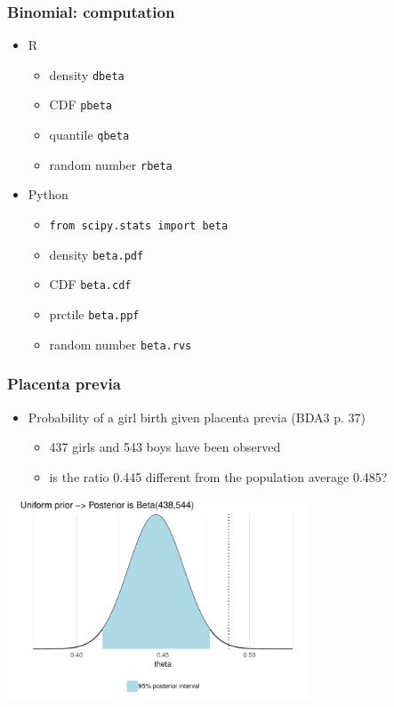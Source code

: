 \documentclass[english,t]{beamer}
\begin{document}
\begin{frame}
  \frametitle{Binomial: computation}

  \begin{itemize}
  \item R
    \begin{itemize}
    \item density {\tt dbeta}
    \item CDF {\tt pbeta}
    \item quantile {\tt qbeta}
    \item random number {\tt rbeta}
    \end{itemize}
  \item Python
    \begin{itemize}
    \item {\tt from scipy.stats import beta}
    \item density {\tt beta.pdf}
    \item CDF {\tt beta.cdf}
    \item prctile {\tt beta.ppf}
    \item random number {\tt beta.rvs}
    \end{itemize}
  \end{itemize}

\end{frame}

\begin{frame}
  \frametitle{Placenta previa}

  \begin{itemize}
  \item Probability of a girl birth given placenta previa (BDA3 p. 37)
    \begin{itemize}
    \item 437 girls and 543 boys have been observed
    \item is the ratio 0.445 different from the population average 0.485?
    \end{itemize}
  \end{itemize}
  \pause
  \includegraphics[width=9cm]{figs/demo2_1.pdf}
\end{frame}
\end{document}
